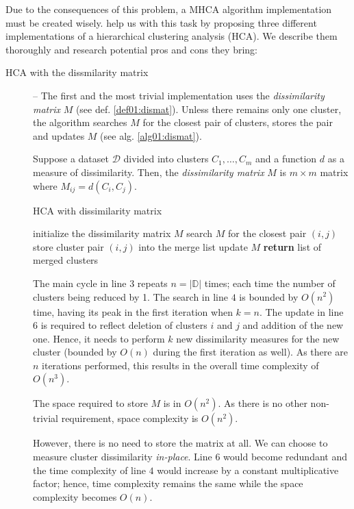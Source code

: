 Due to the consequences of this problem, a MHCA algorithm implementation must be created wisely. \citet{day1984efficient} help us with this task by proposing three different implementations of a hierarchical clustering analysis (HCA). We describe them thoroughly and research potential pros and cons they bring:

\begin{description}
	\item[HCA with the dissmilarity matrix] -- The first and the most trivial implementation uses the \emph{dissimilarity matrix} $M$ (see def. \ref{def01:dismat}). Unless there remains only one cluster, the algorithm searches $M$ for the closest pair of clusters, stores the pair and updates $M$ (see alg. \ref{alg01:dismat}).
	
	\begin{defn}
		Suppose a dataset $\mathcal{D}$ divided into clusters $C_1,\dots,C_m$ and a function $d$ as a measure of dissimilarity. Then, the \emph{dissimilarity matrix} $M$ is $m\times m$ matrix where $M_{ij} = d(C_i,C_j)$.
		\label{def01:dismat}
	\end{defn}
	
	\begin{algorithm}
		\caption{HCA with dissimilarity matrix}
		\label{alg01:dismat}
		\begin{algorithmic}[1]
			\State initialize the dissimilarity matrix $M$
			\State search $M$ for the closest pair $(i,j)$ 
			\State store cluster pair $(i,j)$ into the merge list 
			\State update $M$ 
			\EndFor
			\State \textbf{return} list of merged clusters
			\EndProcedure
		\end{algorithmic}
	\end{algorithm}

	The main cycle in line $3$ repeats $n = |\mathbb{D}|$ times; each time the number of clusters being reduced by 1. The search in line $4$ is bounded by $O(n^2)$ time, having its peak in the first iteration when $k=n$. The update in line $6$ is required to reflect deletion of clusters $i$ and $j$ and addition of the new one. Hence, it needs to perform $k$ new dissimilarity measures for the new cluster (bounded by $O(n)$ during the first iteration as well). As there are $n$ iterations performed, this results in the overall time complexity of $O(n^3)$. 
	
	The space required to store $M$ is in $O(n^2)$. As there is no other non-trivial requirement, space complexity is $O(n^2)$. 
	\begin{rem}
		However, there is no need to store the matrix at all. We can choose to measure cluster dissimilarity \emph{in-place}. Line $6$ would become redundant and the time complexity of line $4$ would increase by a constant multiplicative factor; hence, time complexity remains the same while the space complexity becomes $O(n)$.
	\end{rem}
	


\end{description}

